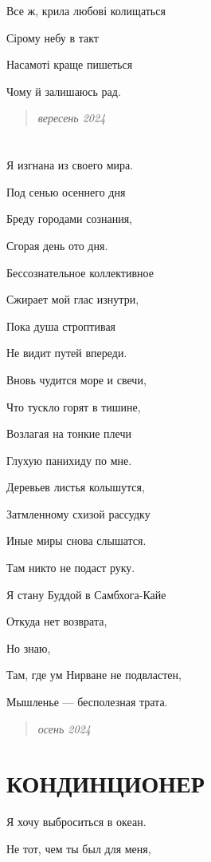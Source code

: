 \documentclass[
  a5paperpaper,
  DIV=11,
  numbers=noendperiod]{scrreprt}
\begin{document}
Все ж, крила любові колищаться

Сірому небу в такт

Насамоті краще пишеться

Чому й залишаюсь рад.

\begin{quote}
\emph{вересень 2024}
\end{quote}

\section{}\label{section-22}

Я изгнана из своего мира.

Под сенью осеннего дня

Бреду городами сознания,

Сгорая день ото дня.

Бессознательное коллективное

Сжирает мой глас изнутри,

Пока душа строптивая

Не видит путей впереди.

Вновь чудится море и свечи,

Что тускло горят в тишине,

Возлагая на тонкие плечи

Глухую панихиду по мне.

Деревьев листья колышутся,

Затмленному схизой рассудку

Иные миры снова слышатся.

Там никто не подаст руку.

Я стану Буддой в Самбхога-Кайе

Откуда нет возврата,

Но знаю,

Там, где ум Нирване не подвластен,

Мышленье --- бесполезная трата.

\begin{quote}
\emph{осень 2024}
\end{quote}

\section{КОНДИНЦИОНЕР}\label{ux43aux43eux43dux434ux438ux43dux446ux438ux43eux43dux435ux440}

Я хочу выброситься в океан.

Не тот, чем ты был для меня,
\end{document}
